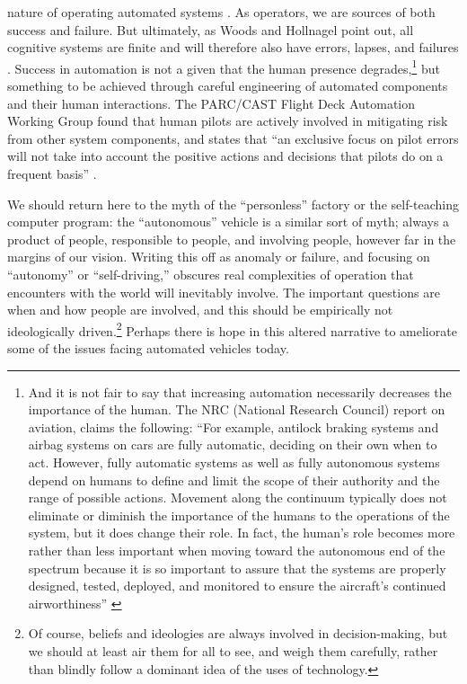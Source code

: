 nature of operating automated
systems \cite[p. 1]{woodshollnagel}. As operators, we are
sources of both success and failure. But ultimately, as Woods and
Hollnagel point out, all cognitive systems are finite and will
therefore also have errors, lapses, and
failures \cite[p. 1--2]{woodshollnagel}. Success in automation is not
a given that the human presence degrades,\footnote{And it is not fair
  to say that increasing automation necessarily decreases the
  importance of the human. The NRC (National
  Research Council) report on aviation, claims the following: 
``For example, antilock braking systems and airbag systems on cars are
fully automatic, deciding on their own when to act. However, fully
automatic systems as well as fully
autonomous systems depend on humans to define and limit the scope of
their authority and the range of possible actions. Movement along the
continuum typically does not eliminate or diminish the importance
of the humans to the operations of the system, but it does change
their role. In fact, the human's role
becomes more rather than less important when moving toward the
autonomous end of the spectrum
because it is so important to assure that the systems are
properly designed, tested, deployed, and monitored to ensure the
aircraft's continued airworthiness'' \cite[p. 14-15]{NRCAutonomy}}
but something to be  
achieved through careful engineering of automated components and their
human interactions. The PARC/CAST Flight Deck Automation Working Group
found that human pilots are actively involved in mitigating risk from
other system components, and states that ``an exclusive focus on pilot
errors will not take into account the positive actions and decisions
that pilots do on a frequent basis'' \cite[p. 30]{PARCCAST}. 

We should return here to the myth of the ``personless'' factory or the
self-teaching computer program: the ``autonomous'' vehicle is a
similar sort of myth; always a 
product of people, responsible to people, and involving people,
however far in the margins of our vision. Writing this off as
anomaly or failure, and focusing on ``autonomy'' or ``self-driving,''
obscures real complexities of operation that encounters with the world
will inevitably involve. The important questions are when and how 
people are
involved, and this should be empirically not ideologically
driven.\footnote{Of course, beliefs and ideologies are always involved
  in decision-making, but we should at least air them for all to see,
  and weigh them carefully, rather than blindly follow a dominant
  idea of the uses of technology.}
Perhaps there is hope in this altered narrative to ameliorate some of
the issues facing automated vehicles today. 

